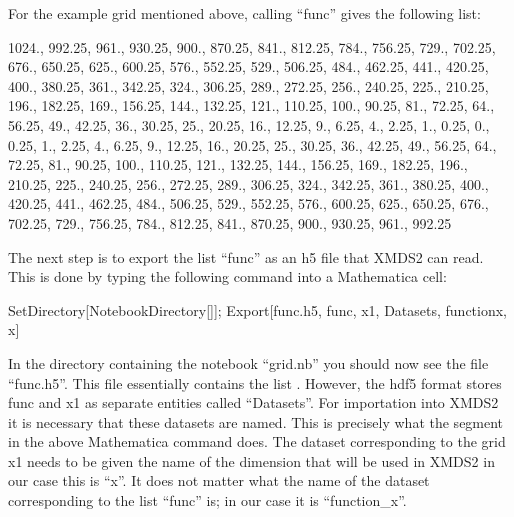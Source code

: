 \documentclass[letterpaper,10pt,english]{sphinxmanual}
\begin{document}
\sphinxAtStartPar
For the example grid mentioned above, calling “func” gives the following list:

\begin{sphinxVerbatim}[commandchars=\\\{\}]
\PYGZob{}1024., 992.25, 961., 930.25, 900., 870.25, 841., 812.25, 784.,
756.25, 729., 702.25, 676., 650.25, 625., 600.25, 576., 552.25, 529.,
506.25, 484., 462.25, 441., 420.25, 400., 380.25, 361., 342.25, 324.,
306.25, 289., 272.25, 256., 240.25, 225., 210.25, 196., 182.25, 169.,
156.25, 144., 132.25, 121., 110.25, 100., 90.25, 81., 72.25, 64.,
56.25, 49., 42.25, 36., 30.25, 25., 20.25, 16., 12.25, 9., 6.25, 4.,
2.25, 1., 0.25, 0., 0.25, 1., 2.25, 4., 6.25, 9., 12.25, 16., 20.25,
25., 30.25, 36., 42.25, 49., 56.25, 64., 72.25, 81., 90.25, 100.,
110.25, 121., 132.25, 144., 156.25, 169., 182.25, 196., 210.25, 225.,
240.25, 256., 272.25, 289., 306.25, 324., 342.25, 361., 380.25, 400.,
420.25, 441., 462.25, 484., 506.25, 529., 552.25, 576., 600.25, 625.,
650.25, 676., 702.25, 729., 756.25, 784., 812.25, 841., 870.25, 900.,
930.25, 961., 992.25\PYGZcb{}
\end{sphinxVerbatim}

\sphinxAtStartPar
The next step is to export the list “func” as an h5 file that XMDS2 can read. This is done by typing the following command into a Mathematica cell:

\begin{sphinxVerbatim}[commandchars=\\\{\}]
SetDirectory[NotebookDirectory[]];
Export[\PYGZdq{}func.h5\PYGZdq{}, \PYGZob{}func, x1\PYGZcb{}, \PYGZob{}\PYGZdq{}Datasets\PYGZdq{}, \PYGZob{} \PYGZdq{}function\PYGZus{}x\PYGZdq{}, \PYGZdq{}x\PYGZdq{}\PYGZcb{}\PYGZcb{}]
\end{sphinxVerbatim}

\sphinxAtStartPar
In the directory containing the notebook “grid.nb” you should now see the file “func.h5”. This file essentially contains the list . However, the hdf5 format stores func and x1 as separate entities called “Datasets”. For importation into XMDS2 it is necessary that these datasets are named. This is precisely what the segment  in the above Mathematica command does. The dataset corresponding to the grid x1 needs to be given the name of the dimension that will be used in XMDS2 \sphinxhyphen{} in our case this is “x”. It does not matter what the name of the dataset corresponding to the list “func” is; in our case it is “function\_x”.
\end{document}
